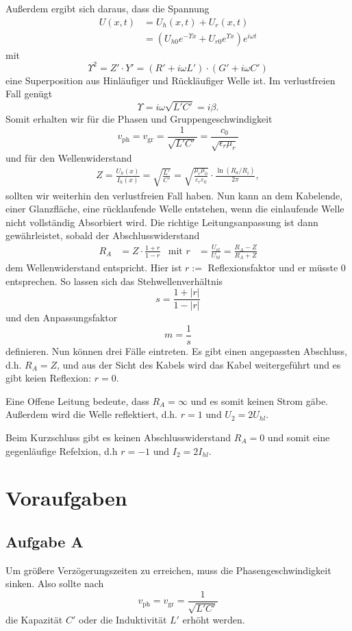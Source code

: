 \documentclass[10pt]{article}
\begin{document}
\begin{multicols}{2}
	Außerdem ergibt sich daraus, dass die Spannung
	\begin{align*}
		U(x, t) & = U_h(x, t) + U_r(x, t)                                                  \\
		        & = \left(U_{h0} e^{-\Upsilon x} + U_{r0} e^{\Upsilon x}\right) e^{i \omega t}
	\end{align*}
	mit
	\[
		\Upsilon^2 = Z' \cdot Y' = \left(R' + i \omega L'\right) \cdot \left(G' + i \omega C'\right)
	\]
	eine Superposition aus Hinläufiger und Rückläufiger Welle ist. Im verlustfreien Fall genügt
	\[
		\Upsilon = i \omega \sqrt{L'C'} = i \beta.
	\]
	Somit erhalten wir für die Phasen und Gruppengeschwindigkeit
	\[
    v_{\text{ph}}=v_{\text{gr}}=\frac{1}{\sqrt{L'C'}}=\frac{c_0}{\sqrt{\epsilon_r\mu_r}}
	\]
	und für den Wellenwiderstand
	\begin{align*}
		Z = \frac{U_h(x)}{I_h(x)} =\sqrt{\frac{L'}{C'}}=\sqrt{\frac{\mu_r \mu_0}{\varepsilon_r \varepsilon_0}} \cdot \frac{\ln\left(R_a/R_i\right)}{2\pi}
,
	\end{align*}
	sollten wir weiterhin den verlustfreien Fall haben.
	Nun kann an dem Kabelende, einer Glanzfläche, eine rücklaufende Welle entstehen, wenn die einlaufende Welle nicht vollständig Absorbiert wird. Die richtige Leitungsanpassung ist dann gewährleistet, sobald der Abschlusswiderstand
	\begin{align*}
		R_A & = Z\cdot\frac{1+r}{1-r} & \text{mit } r & =\frac{U_{rl}}{U_{hl}} = \frac{R_A-Z}{R_A+Z}
	\end{align*}
	dem Wellenwiderstand entspricht. Hier ist \(r:=\) Reflexionsfaktor und er müsste 0 entsprechen. So lassen sich das Stehwellenverhältnis
	\[
		s = \frac{1 + |r|}{1-|r|}
	\]
	und den Anpassungsfaktor
	\[
		m = \frac{1}{s}
	\]
	definieren.
	Nun können drei Fälle eintreten. Es gibt einen angepassten Abschluss, d.h. \(R_A=Z\), und aus der Sicht des Kabels wird das Kabel weitergeführt und es gibt keien Reflexion: \(r=0\).

	Eine Offene Leitung bedeute, dass \(R_A=\infty\) und es somit keinen Strom gäbe. Außerdem wird die Welle reflektiert, d.h. \(r=1\) und \(U_2 = 2U_{hl}\).

	Beim Kurzschluss gibt es keinen Abschlusswiderstand \(R_A=0\) und somit eine gegenläufige Refelxion, d.h \(r=-1\) und $I_2=2I_{hl}$.

	\section{\large Voraufgaben}
	\subsection{Aufgabe A}
	Um größere Verzögerungszeiten zu erreichen, muss die Phasengeschwindigkeit sinken. Also sollte nach \[
		v_{\text{ph}}=v_{\text{gr}}=\frac{1}{\sqrt{L'C'}}
	\]die Kapazität $C'$ oder die Induktivität $L'$ erhöht werden.

\end{multicols}
\end{document}
